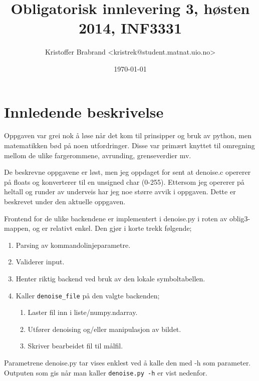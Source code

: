 \documentclass{article}
\title{Obligatorisk innlevering 3, høsten 2014, INF3331}
\author{Kristoffer Brabrand <kristrek@student.matnat.uio.no>}
\date{\today}
\begin{document}
\maketitle

\section*{Innledende beskrivelse}
Oppgaven var grei nok å løse når det kom til prinsipper og bruk av python, men matematikken bød på noen utfordringer. Disse var primært knyttet til omregning mellom de ulike fargerommene, avrunding, grenseverdier mv.

De beskrevne oppgavene er løst, men jeg oppdaget for sent at denoise.c opererer på floats og konverterer til en unsigned char (0-255). Ettersom jeg opererer på heltall og runder av underveis har jeg noe større avvik i oppgaven. Dette er beskrevet under den aktuelle oppgaven.

Frontend for de ulike backendene er implementert i denoise.py i roten av oblig3-mappen, og er relativt enkel. Den gjør i korte trekk følgende;

\begin{enumerate}
  \item Parsing av kommandolinjeparametre.
  \item Validerer input.
  \item Henter riktig backend ved bruk av den lokale symboltabellen.
  \item Kaller \verb;denoise_file; på den valgte backenden;
  \begin{enumerate}
  	\item Laster fil inn i liste/numpy.ndarray.
  	\item Utfører denoising og/eller manipulasjon av bildet.
  	\item Skriver bearbeidet fil til målfil.
  \end{enumerate}
\end{enumerate}

Parametrene denoise.py tar vises enklest ved å kalle den med -h som parameter. Outputen som gis når man kaller \verb;denoise.py -h; er vist nedenfor.








\end{document}
